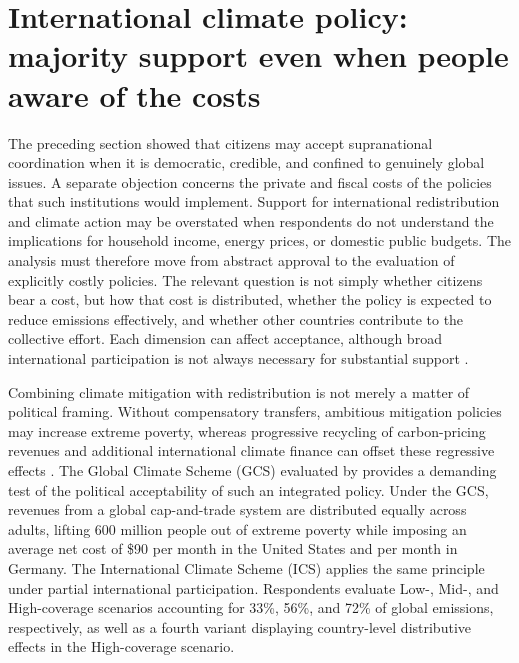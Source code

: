 \section{International climate policy: majority support even when people aware of the costs}

The preceding section showed that citizens may accept supranational coordination when it is democratic, credible, and confined to genuinely global issues. A separate objection concerns the private and fiscal costs of the policies that such institutions would implement. Support for international redistribution and climate action may be overstated when respondents do not understand the implications for household income, energy prices, or domestic public budgets. The analysis must therefore move from abstract approval to the evaluation of explicitly costly policies. The relevant question is not simply whether citizens bear a cost, but how that cost is distributed, whether the policy is expected to reduce emissions effectively, and whether other countries contribute to the collective effort. Each dimension can affect acceptance, although broad international participation is not always necessary for substantial support \citep{bechtel_mass_2013,bernauer_how_2015,mcgrath_how_2017}.

Combining climate mitigation with redistribution is not merely a matter of political framing. Without compensatory transfers, ambitious mitigation policies may increase extreme poverty, whereas progressive recycling of carbon-pricing revenues and additional international climate finance can offset these regressive effects \citep{soergel_combining_2021}. The Global Climate Scheme (GCS) evaluated by \citet{fabre_public_2026} provides a demanding test of the political acceptability of such an integrated policy. Under the GCS, revenues from a global cap-and-trade system are distributed equally across adults, lifting 600 million people out of extreme poverty while imposing an average net cost of \$90 per month in the United States and  per month in Germany. The International Climate Scheme (ICS) applies the same principle under partial international participation. Respondents evaluate Low-, Mid-, and High-coverage scenarios accounting for 33\%, 56\%, and 72\% of global emissions, respectively, as well as a fourth variant displaying country-level distributive effects 
in the High-coverage scenario. %

